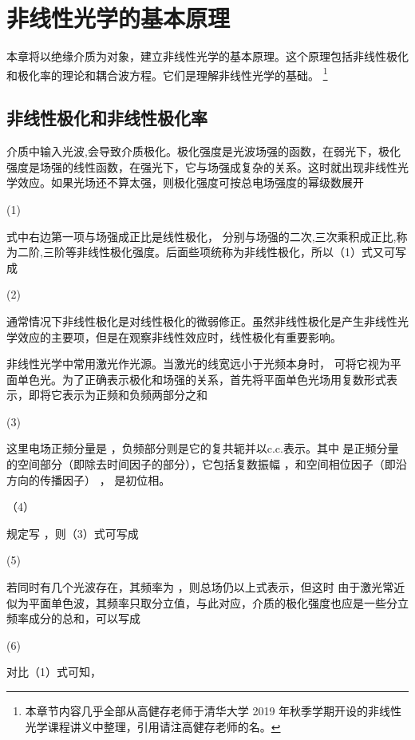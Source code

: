 

\section{非线性光学的基本原理}
本章将以绝缘介质为对象，建立非线性光学的基本原理。这个原理包括非线性极化和极化率的理论和耦合波方程。它们是理解非线性光学的基础。
\footnote{本章节内容几乎全部从高健存老师于清华大学 2019 年秋季学期开设的非线性光学课程讲义中整理，引用请注高健存老师的名。}



\subsection{非线性极化和非线性极化率}
介质中输入光波,会导致介质极化。极化强度是光波场强的函数，在弱光下，极化强度是场强的线性函数，在强光下，它与场强成复杂的关系。这时就出现非线性光学效应。如果光场还不算太强，则极化强度可按总电场强度的幂级数展开

                    (1)                         

式中右边第一项与场强成正比是线性极化，  分别与场强的二次,三次乘积成正比,称为二阶,三阶等非线性极化强度。后面些项统称为非线性极化，所以（1）式又可写成

                                (2)

通常情况下非线性极化是对线性极化的微弱修正。虽然非线性极化是产生非线性光学效应的主要项，但是在观察非线性效应时，线性极化有重要影响。

非线性光学中常用激光作光源。当激光的线宽远小于光频本身时， 可将它视为平面单色光。为了正确表示极化和场强的关系，首先将平面单色光场用复数形式表示，即将它表示为正频和负频两部分之和

           (3)

这里电场正频分量是 ，负频部分则是它的复共轭并以c.c.表示。其中 是正频分量的空间部分（即除去时间因子的部分），它包括复数振幅 ，和空间相位因子（即沿 方向的传播因子） ，  是初位相。        

                                  （4）

规定写        ，则（3）式可写成

                                     (5)

若同时有几个光波存在，其频率为 ，则总场仍以上式表示，但这时 
由于激光常近似为平面单色波，其频率只取分立值，与此对应，介质的极化强度也应是一些分立频率成分的总和，可以写成

                                             (6)

对比（1）式可知，

